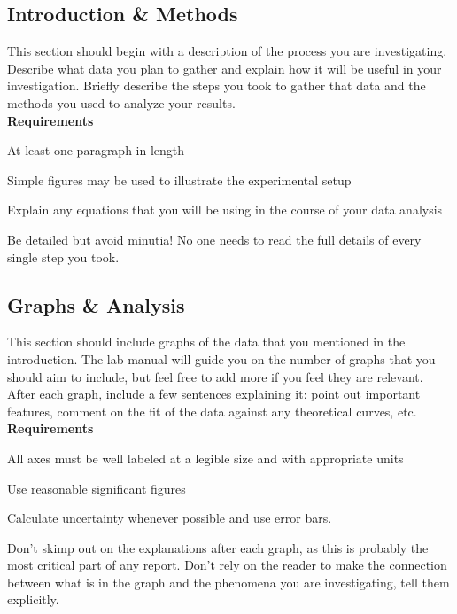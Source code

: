 \subsection*{Introduction \& Methods}
This section should begin with a description of the process you are investigating.
Describe what data you plan to gather and explain how it will be useful in your investigation.
Briefly describe the steps you took to gather that data and the methods you used to analyze your results. \\
\textbf{Requirements}
\begin{list}{-}{\topsep=0pt \itemsep=0pt}
	\item At least one paragraph in length
	\item Simple figures may be used to illustrate the experimental setup
	\item Explain any equations that you will be using in the course of your data analysis
	\item Be detailed but avoid minutia! No one needs to read the full details of every single step you took. 
\end{list}

\subsection*{Graphs \& Analysis}
This section should include graphs of the data that you mentioned in the introduction.
The lab manual will guide you on the number of graphs that you should aim to include, but feel free to add more if you feel they are relevant.
After each graph, include a few sentences explaining it: point out important features, comment on the fit of the data against any theoretical curves, etc. \\
\textbf{Requirements}
\begin{list}{-}{\topsep=0pt \itemsep=0pt}
	\item All axes must be well labeled at a legible size and with appropriate units
	\item Use reasonable significant figures
	\item Calculate uncertainty whenever possible and use error bars.
	\item Don't skimp out on the explanations after each graph, as this is probably the most critical part of any report. Don't rely on the reader to make the connection between what is in the graph and the phenomena you are investigating, tell them explicitly.
\end{list}

